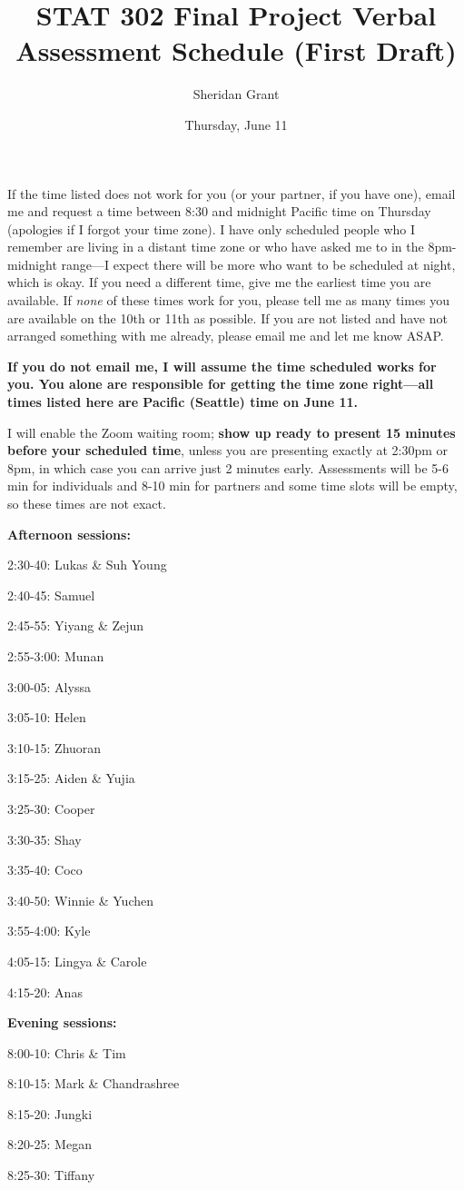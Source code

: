 \documentclass[12pt]{article}
\title{STAT 302 Final Project Verbal Assessment Schedule (First Draft)}
\author{Sheridan Grant}
\date{Thursday, June 11}
\begin{document}
\sloppy

\maketitle

If the time listed does not work for you (or your partner, if you have one), email me and request a time between 8:30 and midnight Pacific time on Thursday (apologies if I forgot your time zone). I have only scheduled people who I remember are living in a distant time zone or who have asked me to in the 8pm-midnight range---I expect there will be more who want to be scheduled at night, which is okay. If you need a different time, give me the earliest time you are available. If \textit{none} of these times work for you, please tell me as many times you are available on the 10th or 11th as possible. If you are not listed and have not arranged something with me already, please email me and let me know ASAP.

\textbf{If you do not email me, I will assume the time scheduled works for you. You alone are responsible for getting the time zone right---all times listed here are Pacific (Seattle) time on June 11.}

I will enable the Zoom waiting room; \textbf{show up ready to present 15 minutes before your scheduled time}, unless you are presenting exactly at 2:30pm or 8pm, in which case you can arrive just 2 minutes early. Assessments will be 5-6 min for individuals and 8-10 min for partners and some time slots will be empty, so these times are not exact.

\begin{multicols}{2}

\textbf{Afternoon sessions:}

2:30-40: Lukas \& Suh Young 

2:40-45: Samuel 

2:45-55: Yiyang \& Zejun 

2:55-3:00: Munan 

3:00-05: Alyssa 

3:05-10: Helen 

3:10-15: Zhuoran 

3:15-25: Aiden \& Yujia 

3:25-30: Cooper 

3:30-35: Shay 

3:35-40: Coco 

3:40-50: Winnie \& Yuchen 

3:55-4:00: Kyle

4:05-15: Lingya \& Carole 

4:15-20: Anas

\textbf{Evening sessions:}

8:00-10: Chris \& Tim 

8:10-15: Mark \& Chandrashree 

8:15-20: Jungki 

8:20-25: Megan

8:25-30: Tiffany

\end{multicols}
\end{document}
